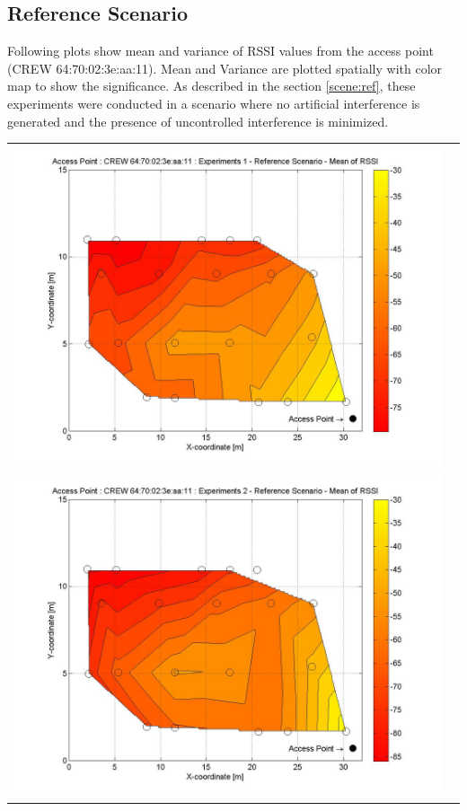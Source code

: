 \documentclass[11pt,a4paper,headinclude,footinclude,chapterprefix=on]{scrreprt}
\begin{document}
\subsection{Reference Scenario} 
Following plots show mean and variance of RSSI values from the access point (CREW 64:70:02:3e:aa:11). Mean and Variance are plotted spatially with color map to show the significance. As described in the section \ref{scene:ref}, these experiments were conducted in a scenario where no artificial interference is generated and the presence of uncontrolled interference is minimized.
\begin{longtable}
	{lr} 
	\includegraphics[width=13cm]{../../Source/plot/CREW_11/11_Ref_Ex_1_Mean.jpg} \\
	\includegraphics[width=13cm]{../../Source/plot/CREW_11/11_Ref_Ex_2_Mean.jpg} \\

\end{longtable}
\end{document}
